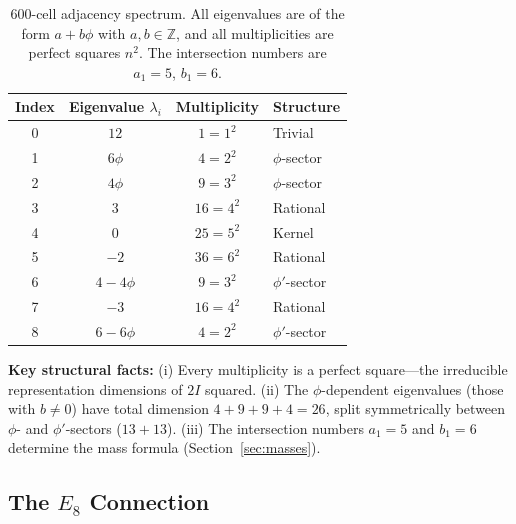 \documentclass[12pt,a4paper]{article}
\theoremstyle{definition}
\begin{document}
\begin{table}[H]
\centering
\begin{tabular}{cccl}
\toprule
\textbf{Index} & \textbf{Eigenvalue} $\lambda_i$ & \textbf{Multiplicity} & \textbf{Structure} \\
\midrule
0 & $12$ & $1 = 1^2$ & Trivial \\
1 & $6\phi$ & $4 = 2^2$ & $\phi$-sector \\
2 & $4\phi$ & $9 = 3^2$ & $\phi$-sector \\
3 & $3$ & $16 = 4^2$ & Rational \\
4 & $0$ & $25 = 5^2$ & Kernel \\
5 & $-2$ & $36 = 6^2$ & Rational \\
6 & $4 - 4\phi$ & $9 = 3^2$ & $\phi'$-sector \\
7 & $-3$ & $16 = 4^2$ & Rational \\
8 & $6 - 6\phi$ & $4 = 2^2$ & $\phi'$-sector \\
\bottomrule
\end{tabular}
\caption{600-cell adjacency spectrum. All eigenvalues are of the form $a + b\phi$ with $a,b \in \mathbb{Z}$, and all multiplicities are perfect squares $n^2$. The intersection numbers are $a_1 = 5$, $b_1 = 6$.}
\label{tab:spectrum}
\end{table}

\textbf{Key structural facts:} (i) Every multiplicity is a perfect square---the irreducible representation dimensions of $2I$ squared. (ii) The $\phi$-dependent eigenvalues (those with $b \neq 0$) have total dimension $4 + 9 + 9 + 4 = 26$, split symmetrically between $\phi$- and $\phi'$-sectors ($13 + 13$). (iii) The intersection numbers $a_1 = 5$ and $b_1 = 6$ determine the mass formula (Section~\ref{sec:masses}).

\subsection{The \texorpdfstring{$E_8$}{E8} Connection}
\end{document}
